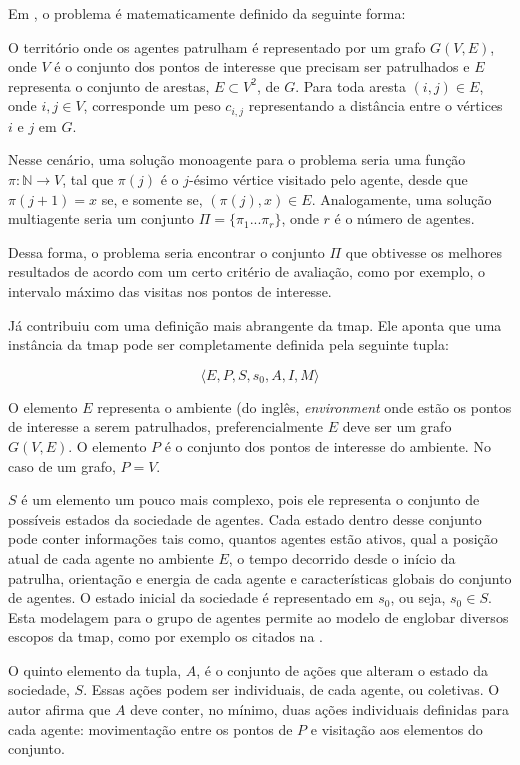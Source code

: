 Em \citep{Chevaleyre:2004:TAM:1018411.1019013}, o problema é matematicamente 
definido da seguinte forma:

O território onde os agentes patrulham é representado por um grafo $G(V,E)$, 
onde $V$ é o conjunto dos pontos de interesse que precisam ser patrulhados e 
$E$ representa o conjunto de arestas, $E \subset V^{2}$, de $G$. Para toda 
aresta $(i,j) \in E$, onde $i,j \in V$, corresponde um peso $c_{i,j}$ 
representando a distância entre o vértices $i$ e $j$ em $G$. 

Nesse cenário, uma solução monoagente para o problema seria uma função 
$ \pi : \mathbb{N} \longrightarrow V$, tal que $ \pi(j)$ 
é o $j$-ésimo vértice visitado pelo agente, desde que 
$ \pi(j+1) = x $ se, e somente se, $ (\pi(j), x) \in E $. Analogamente, 
uma solução multiagente seria um conjunto $ \Pi = \{ \pi_{1} ... \pi_{r} \}$, 
onde $r$ é o número de agentes.

Dessa forma, o problema seria encontrar o conjunto $ \Pi $ que obtivesse os 
melhores resultados de acordo com um certo critério de avaliação, como por 
exemplo, o intervalo máximo das visitas nos pontos de interesse.

Já \citep{sampaiophd} contribuiu com uma definição mais abrangente da \ac{tmap}. 
Ele aponta que uma instância da \ac{tmap} pode ser completamente definida pela 
seguinte tupla: 

$$ \langle E, P, S, s_{0}, A, I, M \rangle $$

O elemento $E$ representa o ambiente (do inglês, \textit{environment} onde estão 
os pontos de interesse a serem patrulhados, preferencialmente $E$ deve ser um 
grafo $G(V,E)$. O elemento $P$ é o conjunto dos pontos de interesse do ambiente. 
No caso de um grafo, $P = V$.

$S$ é um elemento um pouco mais complexo, pois ele 
representa o conjunto de possíveis estados da sociedade de agentes. Cada estado 
dentro desse conjunto pode conter informações tais como, quantos agentes estão 
ativos, qual a posição atual de cada agente no ambiente $E$, o tempo decorrido 
desde o início da patrulha, orientação e energia de cada agente e 
características globais do conjunto de agentes. O estado inicial da sociedade é 
representado em $s_{0}$, ou seja, $s_{0} \in S$. Esta modelagem para o grupo de 
agentes permite ao modelo de \citep{sampaiophd} englobar diversos escopos da 
\ac{tmap}, como por exemplo os citados na .

O quinto elemento da tupla, $A$, é o conjunto de ações que alteram o estado da 
sociedade, $S$. Essas ações podem ser individuais, de cada agente, ou coletivas. 
O autor afirma que $A$ deve conter, no mínimo, duas ações individuais definidas 
para cada agente: movimentação entre os pontos de $P$ e visitação aos elementos 
do conjunto.

